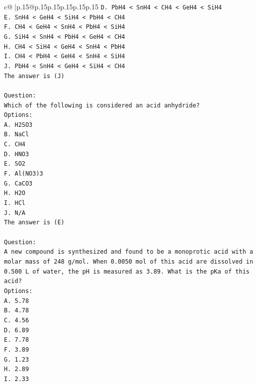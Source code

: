 \documentclass{article}
\begin{document}
{\begin{supertabular}{c@{$\;$}|p{.15\linewidth}@{}p{.15\linewidth}p{.15\linewidth}p{.15\linewidth}p{.15\linewidth}p{.15\linewidth}}
{{{\texttt{D. PbH4 < SnH4 < CH4 < GeH4 < SiH4} \\
\texttt{E. SnH4 < GeH4 < SiH4 < PbH4 < CH4} \\
\texttt{F. CH4 < GeH4 < SnH4 < PbH4 < SiH4} \\
\texttt{G. SiH4 < SnH4 < PbH4 < GeH4 < CH4} \\
\texttt{H. CH4 < SiH4 < GeH4 < SnH4 < PbH4} \\
\texttt{I. CH4 < PbH4 < GeH4 < SnH4 < SiH4} \\
\texttt{J. PbH4 < SnH4 < GeH4 < SiH4 < CH4} \\
\texttt{The answer is (J)} \\
\\ 
\texttt{Question:} \\
\texttt{Which of the following is considered an acid anhydride?} \\
\texttt{Options:} \\
\texttt{A. H2SO3} \\
\texttt{B. NaCl} \\
\texttt{C. CH4} \\
\texttt{D. HNO3} \\
\texttt{E. SO2} \\
\texttt{F. Al(NO3)3} \\
\texttt{G. CaCO3} \\
\texttt{H. H2O} \\
\texttt{I. HCl} \\
\texttt{J. N/A} \\
\texttt{The answer is (E)} \\
\\ 
\texttt{Question:} \\
\texttt{A new compound is synthesized and found to be a monoprotic acid with a molar mass of 248 g/mol. When 0.0050 mol of this acid are dissolved in 0.500 L of water, the pH is measured as 3.89. What is the pKa of this acid?} \\
\texttt{Options:} \\
\texttt{A. 5.78} \\
\texttt{B. 4.78} \\
\texttt{C. 4.56} \\
\texttt{D. 6.89} \\
\texttt{E. 7.78} \\
\texttt{F. 3.89} \\
\texttt{G. 1.23} \\
\texttt{H. 2.89} \\
\texttt{I. 2.33} \\
}}}
\end{supertabular}}
\end{document}
